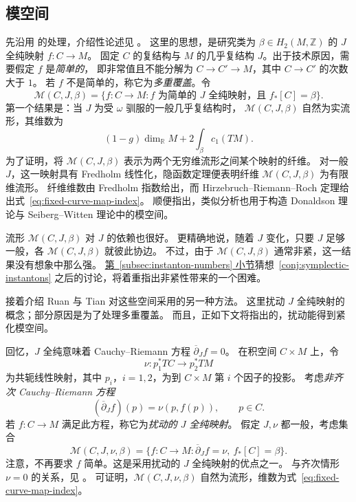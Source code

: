 \subsection{模空间}\label{subsec:symplectic-map-moduli}
先沿用  的处理，介绍性论述见 。
这里的思想，是研究类为 $\beta\in H_2(M,\mathbb Z)$ 的 $J$ 全纯映射 $f:C\to M$。
固定 $C$ 的复结构与 $M$ 的几乎复结构 $J$。出于技术原因，需要假定 $f$ 是\emph{简单的}，
即非常值且不能分解为 $C\to C'\to M$，其中 $C\to C'$ 的次数大于 $1$。
若 $f$ 不是简单的，称它为\emph{多重覆盖}。令
\[
\mathcal M(C,J,\beta)=
\{f:C\to M:f\text{ 为简单的 }J\text{ 全纯映射，且 }f_*[C]=\beta\}.
\]
第一个结果是：当 $J$ 为受 $\omega$ 驯服的一般几乎复结构时，
$\mathcal M(C,J,\beta)$ 自然为实流形，其维数为
\begin{equation}\label{eq:fixed-curve-map-index}
(1-g)\dim_{\mathbb R}M+2\int_\beta c_1(TM).
\end{equation}
为了证明，将 $\mathcal M(C,J,\beta)$ 表示为两个无穷维流形之间某个映射的纤维。
对一般 $J$，这一映射具有 Fredholm 线性化，隐函数定理便表明纤维
$\mathcal M(C,J,\beta)$ 为有限维流形。
纤维维数由 Fredholm 指数给出，而 Hirzebruch--\allowbreak Riemann--\allowbreak Roch 定理给出式~\eqref{eq:fixed-curve-map-index}。
顺便指出，类似分析也用于构造 Donaldson 理论与 Seiberg--Witten 理论中的模空间。

流形 $\mathcal M(C,J,\beta)$ 对 $J$ 的依赖也很好。
更精确地说，随着 $J$ 变化，只要 $J$ 足够一般，各 $\mathcal M(C,J,\beta)$ 就彼此协边。
不过，由于 $\mathcal M(C,J,\beta)$ 通常非紧，这一结果没有想象中那么强。
\hyperref[subsec:instanton-numbers]{第~\ref*{subsec:instanton-numbers} 小节}猜想~\ref{conj:symplectic-instantons} 之后的讨论，将着重指出非紧性带来的一个困难。

接着介绍 Ruan 与 Tian  对这些空间采用的另一种方法。
这里扰动 $J$ 全纯映射的概念；部分原因是为了处理多重覆盖。
而且，正如下文将指出的，扰动能得到紧化模空间。

回忆，$J$ 全纯意味着 Cauchy--Riemann 方程 $\overline\partial_Jf=0$。
在积空间 $C\times M$ 上，令
\[
\nu:p_1^*TC\longrightarrow p_2^*TM
\]
为共轭线性映射，其中 $p_i$，$i=1,2$，为到 $C\times M$ 第 $i$ 个因子的投影。
考虑\emph{非齐次 Cauchy--Riemann 方程}
\[
(\overline\partial_Jf)(p)=\nu(p,f(p)),\qquad p\in C.
\]
若 $f:C\to M$ 满足此方程，称它为\emph{扰动的 $J$ 全纯映射}。
假定 $J,\nu$ 都一般，考虑集合
\[
\mathcal M(C,J,\nu,\beta)
=\{f:C\to M:\overline\partial_Jf=\nu,\ f_*[C]=\beta\}.
\]
注意，不再要求 $f$ 简单。这是采用扰动的 $J$ 全纯映射的优点之一。
与齐次情形 $\nu=0$ 的关系，见 。
可证明，$\mathcal M(C,J,\nu,\beta)$ 自然为流形，维数为式~\eqref{eq:fixed-curve-map-index}。

